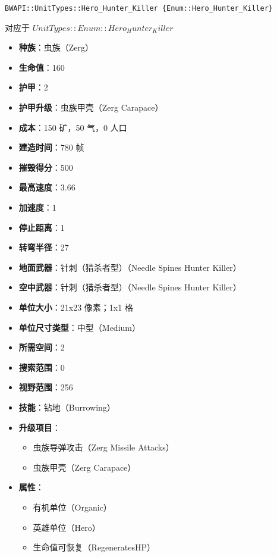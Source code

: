 \begin{tcolorbox}[colback=white, colframe=black!60!white, title=Hero\_Hunter\_Killer(), arc=0mm]
    \begin{verbatim}
BWAPI::UnitTypes::Hero_Hunter_Killer {Enum::Hero_Hunter_Killer}
    \end{verbatim}
    对应于  $ UnitTypes::Enum::Hero_Hunter_Killer $ 
    \begin{itemize}
        \item \textbf{种族}：虫族（Zerg）
        \item \textbf{生命值}：160
        \item \textbf{护甲}：2
        \item \textbf{护甲升级}：虫族甲壳（Zerg Carapace）
        \item \textbf{成本}：150 矿，50 气，0 人口
        \item \textbf{建造时间}：780 帧
        \item \textbf{摧毁得分}：500
        \item \textbf{最高速度}：3.66
        \item \textbf{加速度}：1
        \item \textbf{停止距离}：1
        \item \textbf{转弯半径}：27
        \item \textbf{地面武器}：针刺（猎杀者型）（Needle Spines Hunter Killer）
        \item \textbf{空中武器}：针刺（猎杀者型）（Needle Spines Hunter Killer）
        \item \textbf{单位大小}：21x23 像素；1x1 格
        \item \textbf{单位尺寸类型}：中型（Medium）
        \item \textbf{所需空间}：2
        \item \textbf{搜索范围}：0
        \item \textbf{视野范围}：256
        \item \textbf{技能}：钻地（Burrowing）
        \item \textbf{升级项目}：
            \begin{itemize}
                \item 虫族导弹攻击（Zerg Missile Attacks）
                \item 虫族甲壳（Zerg Carapace）
            \end{itemize}
        \item \textbf{属性}：
            \begin{itemize}
                \item 有机单位（Organic）
                \item 英雄单位（Hero）
                \item 生命值可恢复（RegeneratesHP）
            \end{itemize}
    \end{itemize}
\end{tcolorbox}

